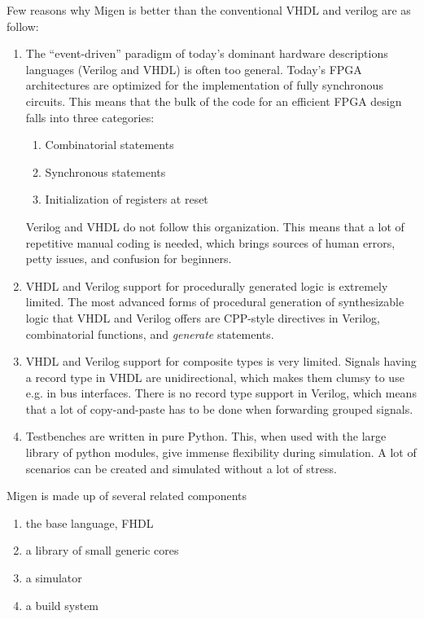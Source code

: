 Few reasons why Migen is better than the conventional VHDL and verilog are as follow:
\begin{enumerate}
\item The “event-driven” paradigm of today’s dominant hardware descriptions languages (Verilog and VHDL) is often too general. Today’s FPGA architectures are optimized for the implementation of fully synchronous circuits. This means that the bulk of the code for an efficient FPGA design falls into three categories:
\begin{enumerate}
\item Combinatorial statements
\item Synchronous statements
\item Initialization of registers at reset
\end{enumerate}
Verilog and VHDL do not follow this organization. This means that a lot of repetitive manual coding is needed, which brings sources of human errors, petty issues, and confusion for beginners.
\item VHDL and Verilog support for procedurally generated logic is extremely limited. The most advanced forms of procedural generation of synthesizable logic that VHDL and Verilog offers are CPP-style directives in Verilog, combinatorial functions, and  \textit{generate} statements.
\item VHDL and Verilog support for composite types is very limited. Signals having a record type in VHDL are unidirectional, which makes them clumsy to use e.g. in bus interfaces. There is no record type support in Verilog, which means that a lot of copy-and-paste has to be done when forwarding grouped signals.
\item Testbenches are written in pure Python. This, when used with the large library of python modules, give immense flexibility during simulation. A lot of scenarios can be created and simulated without a lot of stress.
\end{enumerate}

Migen is made up of several related components
\begin{enumerate}
\item the base language, FHDL
\item a library of small generic cores
\item a simulator
\item a build system
\end{enumerate}

%





